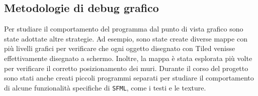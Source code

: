 \documentclass{article}
\begin{document}
\subsection{Metodologie di debug grafico}
Per studiare il comportamento del programma dal punto di vista grafico sono state adottate altre strategie. Ad esempio, sono state create diverse mappe con più livelli grafici per verificare che ogni oggetto disegnato con Tiled venisse effettivamente disegnato a schermo. Inoltre, la mappa è stata esplorata più volte per verificare il corretto posizionamento dei muri. Durante il corso del progetto sono stati anche creati piccoli programmi separati per studiare il comportamento di alcune funzionalità specifiche di \verb|SFML|, come i testi e le texture.
\end{document}

